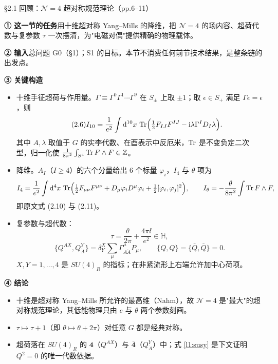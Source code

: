 \begin{kcard}{§2.1 回顾：$\mathcal N=4$ 超对称规范理论（pp.6--11）}

\noindent\textbf{① 这一节的任务}\quad 用十维超对称 Yang--Mills 的降维，把 $\mathcal N=4$ 的场内容、超荷代数与复参数 $\tau$ 一次摆清，为"电磁对偶"提供精确的物理载体。\pA{}

\noindent\textbf{② 输入}\quad 总问题 G0（\S1）；S1 的目标。本节不消费任何前节技术结果，是整条链的出发点。

\noindent\textbf{③ 关键构造}\quad
\begin{itemize}
\item 十维手征超荷与作用量。$\Gamma\equiv\Gamma^0\Gamma^1\cdots\Gamma^9$ 在 $S_\pm$ 上取 $\pm1$；取 $\epsilon\in S_+$ 满足 $\Gamma\epsilon=\epsilon$，则
\begin{equation}\label{l1:i10}\tag{2.6}
I_{10}=\frac{1}{e^2}\int \mathrm{d}^{10}x\,\operatorname{Tr}\Bigl(\tfrac12 F_{IJ}F^{IJ}-\mathrm{i}\lambda\Gamma^I D_I\lambda\Bigr).
\end{equation}
其中 $A,\lambda$ 取值于 $G$ 的实李代数、在酉表示中反厄米，$\operatorname{Tr}$ 是不变负定二次型，归一化使 $\frac1{8\pi^2}\int_{S^4}\operatorname{Tr} F\wedge F\in\mathbb{Z}$。\pA{}
\item 降维。$A_I$（$I\ge4$）的六个分量给出 6 个标量 $\varphi_i$，$I_4$ 与 $\theta$ 项为
\[
I_4=\frac1{e^2}\int\mathrm{d}^4x\,\operatorname{Tr}\Bigl(\tfrac12F_{\mu\nu}F^{\mu\nu}+D_\mu\varphi_iD^\mu\varphi_i+\tfrac12[\varphi_i,\varphi_j]^2\Bigr),\qquad
I_\theta=-\frac{\theta}{8\pi^2}\int\operatorname{Tr} F\wedge F ,
\]
即原文式 (2.10) 与 (2.11)。\pA{}
\item 复参数与超代数：
\begin{equation}\label{l1:tau}\tag{2.12}
\tau=\frac{\theta}{2\pi}+\frac{4\pi\ii}{e^2}\in\mathbb H ,
\end{equation}
\begin{equation}\label{l1:susy}\tag{2.15}
\{Q^{AX},Q^{Y}_{\dot A}\}=\delta^X_Y\sum_\mu\Gamma^\mu_{A\dot A}P_\mu,\qquad
\{Q,Q\}=\{\bar Q,\bar Q\}=0 .
\end{equation}
$X,Y=1,\dots,4$ 是 $SU(4)_R$ 的指标；在非紧流形上右端允许加中心荷项。\pA{}
\end{itemize}

\noindent\textbf{④ 结论}\quad
\begin{itemize}
\item 十维是超对称 Yang--Mills 所允许的最高维（Nahm），故 $\mathcal N=4$ 是"最大"的超对称规范理论，其低能物理只由 $e$ 与 $\theta$ 两个参数刻画。\pA{}
\item $\tau\mapsto\tau+1$（即 $\theta\mapsto\theta+2\pi$）对任意 $G$ 都是经典对称。\pA{}
\item 超荷落在 $SU(4)_R$ 的 $\mathbf 4$（$Q^{AX}$）与 $\bar{\mathbf 4}$（$Q^{Y}_{\dot A}$）中；式 \eqref{l1:susy} 是下文证明 $Q^2=0$ 的唯一代数依据。\pA{}
\end{itemize}


\end{kcard}
